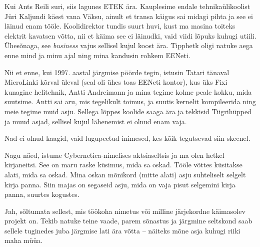 Kui Ants Reili suri, siis lagunes ETEK ära. 
Kauplesime endale tehnikaülikoolist Jüri 
Kaljundi käest vana Väksu, ainult et 
transa käigus sai midagi pihta ja see ei läinud enam tööle. Koolidirektor tundis suurt
huvi, kust ma masina toiteks elektrit kavatsen võtta, nii et käima see 
ei läinudki, vaid viidi lõpuks kuhugi utiili. Ühesõnaga, see \emph{business} vajus 
sellisel kujul koost ära. Tipphetk oligi natuke aega enne mind ja minu 
ajal ning mina kandusin rohkem EENeti. 

Nii et enne, kui 1997. aastal järgmise pöörde tegin, istusin 
Tatari tänaval MicroLinki kõrval üleval (seal oli ühes toas EENeti kontor), kus 
üks Fixi kunagine helitehnik, Antti Andreimann ja mina tegime kolme peale kokku, mida suutsime. Antti 
sai aru, mis tegelikult toimus, ja suutis kernelit kompileerida ning meie tegime 
muid asju. Sellega lõppes koolide saaga ära ja tekkisid 
Tiigrihüpped ja muud asjad, sellisel kujul lähenemist ei 
olnud enam vaja. 


Nad ei olnud kaagid, vaid lugupeetud inimesed, kes kõik tegutsevad siin skeenel. 


Nagu näed, istume Cybernetica-nimelises aktsiaseltsis ja 
ma olen hetkel kirjaneitsi. See on maru raske küsimus, mida sa oskad. 
Tööle võttes küsitakse alati, mida sa oskad. Mina oskan mõnikord (mitte 
alati) asju suhteliselt selgelt kirja panna. Siin 
majas on segaseid asju, mida on vaja pisut selgemini kirja panna, suurtes 
kogustes. 


Jah, sõltumata sellest, mis töökoha nimetus või milline järjekordne 
käimasolev projekt on. Tekib natuke teine vaade, 
parem sõnastus ja järgmine seltskond saab sellele tuginedes juba järgmise 
lati ära võtta -- näiteks mõne asja kuhugi riiki maha müüa. 